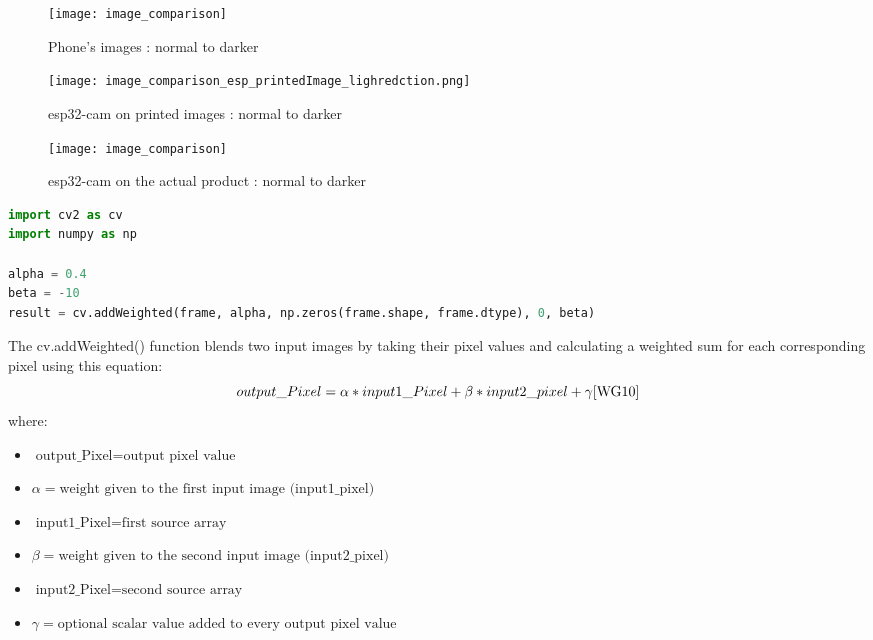 \FloatBarrier
\begin{figure}[h]
\FloatBarrier
         \centering
        \texttt{[image: image\_comparison]}
   
        \caption{Phone's images : normal to darker}
        \label{fig:Phone's images : normal to darker}
\FloatBarrier
    \end{figure}


\FloatBarrier
\FloatBarrier
\begin{figure}[h]
\FloatBarrier
         \centering
        \texttt{[image: image\_comparison\_esp\_printedImage\_lighredction.png]}
   
        \caption{esp32-cam on printed images : normal to darker}
        \label{fig:Phone's images : normal to darker}
\FloatBarrier
    \end{figure}


\FloatBarrier
\FloatBarrier
\begin{figure}[h]
\FloatBarrier
         \centering
        \texttt{[image: image\_comparison]}
   
        \caption{esp32-cam on the actual product : normal to darker}
        \label{fig:Phone's images : normal to darker}
\FloatBarrier
    \end{figure}


\FloatBarrier
\begin{lstlisting}[language=Python]
import cv2 as cv
import numpy as np

alpha = 0.4
beta = -10
result = cv.addWeighted(frame, alpha, np.zeros(frame.shape, frame.dtype), 0, beta)
\end{lstlisting}


The cv.addWeighted() function blends two input images by taking their pixel values and calculating a weighted sum for each corresponding pixel \cite{WG10} using this equation:\\
\begin{equation}
output\_Pixel = \alpha * input1\_Pixel +\beta * input2\_pixel + \gamma \cite{WG10} 
\end{equation}
where: \\
\begin{itemize}
\item $\text{output\_Pixel} = \text{output pixel value}$
\item $\alpha = \text{weight given to the first input image (input1\_pixel)}$
\item $\text{input1\_Pixel} = \text{first source array}$
\item $\beta = \text{weight given to the second input image (input2\_pixel)}$
\item $\text{input2\_Pixel} = \text{second source array}$
\item $\gamma = \text{optional scalar value added to every output pixel value}$
\end{itemize}
